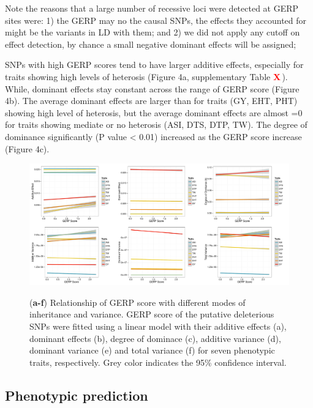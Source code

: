 \documentclass[twoside,twocolumn, letterpaper]{article}
\renewcommand{\baselinestretch}{1}
\newcommand{\X}{\textcolor{red}{\bf X\,}}
\begin{document}
Note the reasons that a large number of recessive loci were detected at GERP sites were: 1) the GERP may no the causal SNPs, the effects they accounted for might be the variants in LD with them; and 2) we did not apply any cutoff on effect detection, by chance a small negative dominant effects will be assigned;     

SNPs with high GERP scores tend to have larger additive effects, especially for traits showing high levels of heterosis (Figure 4a, supplementary Table \X). While, dominant effects stay constant across the range of GERP score (Figure 4b). The average dominant effects are larger than for traits (GY, EHT, PHT) showing high level of heterosis, but the average dominant effects are almost =0 for traits showing mediate or no heterosis (ASI, DTS, DTP, TW).  The degree of dominance significantly (P value < 0.01) increased as the GERP score increase (Figure 4c). 


\begin{figure}[tbh]   
  \begin{center}
   \vspace{-2mm}
   \includegraphics[width=0.8\linewidth]{Fig4_k_others.pdf}
   \renewcommand{\baselinestretch}{0.9}
   \vspace{-3mm}
   \caption{({\bfseries a-f}) Relationship of GERP score with different modes of inheritance and variance. GERP score of the putative deleterious SNPs were fitted using a linear model with their additive effects (a), dominant effects (b), degree of dominace (c), additive variance (d), dominant variance (e) and total variance (f) for seven phenotypic traits, respectively. Grey color indicates the 95\% confidence interval. } 
\vspace{-4mm}
    \label{fig:effk}
  \end{center}
\end{figure}

\subsection*{Phenotypic prediction}
\end{document}
